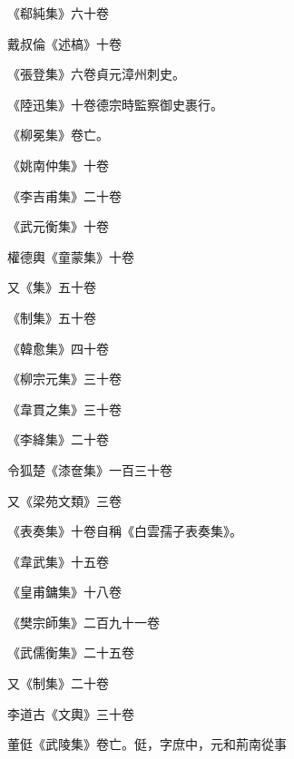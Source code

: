 \begin{pinyinscope}
 《郗純集》六十卷



 戴叔倫《述槁》十卷



 《張登集》六卷貞元漳州刺史。



 《陸迅集》十卷德宗時監察御史裹行。



 《柳冕集》卷亡。



 《姚南仲集》十卷



 《李吉甫集》二十卷



 《武元衡集》十卷



 權德輿《童蒙集》十卷



 又《集》五十卷



 《制集》五十卷



 《韓愈集》四十卷



 《柳宗元集》三十卷



 《韋貫之集》三十卷



 《李絳集》二十卷



 令狐楚《漆奩集》一百三十卷



 又《梁苑文類》三卷



 《表奏集》十卷自稱《白雲孺子表奏集》。



 《韋武集》十五卷



 《皇甫鏞集》十八卷



 《樊宗師集》二百九十一卷



 《武儒衡集》二十五卷



 又《制集》二十卷



 李道古《文輿》三十卷



 董侹《武陵集》卷亡。侹，字庶中，元和荊南從事




\end{pinyinscope}
